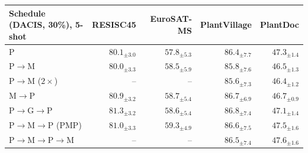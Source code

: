 \begin{tabular}{@{}lrrrr@{}}
\toprule
Schedule (DACIS, 30\%), 5-shot & RESISC45 & EuroSAT-MS & PlantVillage & PlantDoc \\
\midrule
P & $80.1_{\pm3.0}$ & $57.8_{\pm5.3}$ & $86.4_{\pm7.7}$ & $47.3_{\pm1.4}$ \\
P$\to$M & $80.0_{\pm3.3}$ & $58.5_{\pm5.9}$ & $85.8_{\pm7.6}$ & $46.5_{\pm1.3}$ \\
P$\to$M ($2\times$) & -- & -- & $85.6_{\pm7.3}$ & $46.4_{\pm1.2}$ \\
M$\to$P & $80.9_{\pm3.2}$ & $58.7_{\pm5.4}$ & $86.7_{\pm6.9}$ & $46.7_{\pm0.9}$ \\
P$\to$G$\to$P & $81.3_{\pm3.2}$ & $58.6_{\pm5.4}$ & $86.8_{\pm7.4}$ & $47.1_{\pm1.4}$ \\
P$\to$M$\to$P (PMP) & $81.0_{\pm3.3}$ & $59.3_{\pm4.9}$ & $86.6_{\pm7.5}$ & $47.5_{\pm1.6}$ \\
P$\to$M$\to$P$\to$M & -- & -- & $86.5_{\pm7.4}$ & $47.6_{\pm1.6}$ \\
\bottomrule
\end{tabular}
